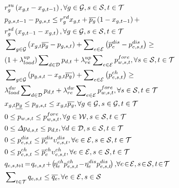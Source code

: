 \documentclass[lettersize,journal]{IEEEtran}
\newenvironment{newsubequations}{\small\begin{subequations}}{\end{subequations}}
\begin{document}
\begin{newsubequations}
\begin{align}
& r_{g}^{{su}}\left(x_{g,t} - x_{g, t-1}\right), \forall g\in\mathcal{G}, s\in\mathcal{S}, t\in\mathcal{T} \label{18-j} \\
& p_{g,s,t-1} - p_{g,s,t} \leq r_{g}^{{rd}} x_{g,t} + \overline{p_{g}} \left(1 - x_{g,t-1}\right) + \notag\\
& r_{g}^{{sd}}\left(x_{g,t-1} - x_{g, t}\right), \forall g\in\mathcal{G}, s\in\mathcal{S}, t\in\mathcal{T} \label{18-k}\\
& \sum\nolimits_{g\in\mathcal{G}} \left( x_{g,t} \overline{p_{g}} - p_{g,s,t}\right) + \sum\nolimits_{e\in\mathcal{E}}\left(\overline{p}_{e}^{dis} - p_{e,s,t}^{dis}\right) \geq \label{18-l}\\
& (1 + \lambda_{load}^{up}) \sum\nolimits_{d\in\mathcal{D}} p_{d,t} + \lambda_{re}^{up} \sum\nolimits_{e\in\mathcal{E}} {p_{w,s,t}^{fore}}, \forall s\in\mathcal{S}, t\in\mathcal{T} \notag\\
& \sum\nolimits_{g\in\mathcal{G}}\left( p_{g,s,t} - x_{g,t} \overline{p_{g}}\right) + \sum\nolimits_{e\in\mathcal{E}}\left(p_{e,s,t}^{{ch}} \right) \geq \label{18-m}\\
& \lambda_{load}^{dw} \sum\nolimits_{d\in\mathcal{D}} p_{d,t} + \lambda_{re}^{dw}\sum\nolimits_{e\in\mathcal{E}} {p_{w,s,t}^{fore}},\forall s\in\mathcal{S}, t\in\mathcal{T} \notag\\
& x_{g,t} \underline{p_{g}} \leq p_{g,s,t} \leq x_{g,t} \overline{p_{g}}, \forall g\in\mathcal{G}, s\in\mathcal{G}, t\in\mathcal{T} \label{18-n}\\
& 0\leq p_{w,s,t} \leq {p_{w,s,t}^{fore}}, \forall g\in\mathcal{W}, s\in\mathcal{S}, t\in\mathcal{T} \label{18-o} \\
& 0\leq \varDelta p_{d,s,t} \leq  p_{d,t}, \forall d\in\mathcal{D}, s\in\mathcal{S}, t\in\mathcal{T} \label{18-p} \\
& 0 \leq p_{e,s,t}^{{dis}} \leq \overline{p}_{e}^{{dis}} \upsilon_{e,s,t}^{{dis}} , \forall e\in\mathcal{E}, s\in\mathcal{S}, t\in\mathcal{T} \label{18-q} \\
& 0 \leq p_{e,s,t}^{{ch}} \leq \overline{p}_{e}^{{ch}} \upsilon_{e,s,t}^{{ch}} , \forall e\in\mathcal{E}, s\in\mathcal{S}, t\in\mathcal{T} \label{18-r}\\
& q_{e,s,t\!+\!1} \!=\! q_{e,s,t} \!+\! \left(\!\eta_{e}^{{ch}}p_{e,s,t}^{{ch}} \!-\! \eta_{e}^{{dis}} p_{e,s,t}^{{dis}}\! \right),\! \forall e\!\in\!\mathcal{E}, s\!\in\!\mathcal{S}, t\!\in\!\mathcal{T} \label{18-s}\\
& \sum\nolimits_{t\in\mathcal{T}} q_{e,s,t} \leq \overline{q_{e}},\forall e\in\mathcal{E}, s\in\mathcal{S} \label{18-t}\\

\end{align}
\end{newsubequations}
\end{document}
